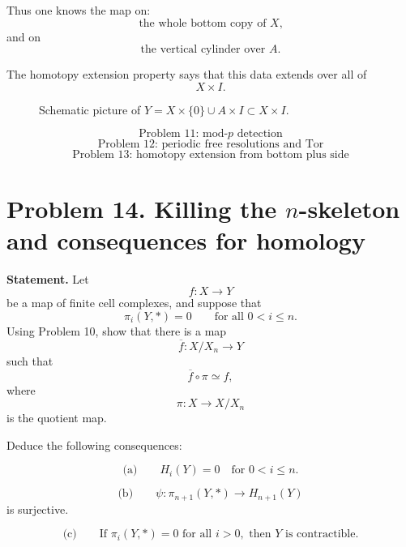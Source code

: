 \documentclass[12pt,a4paper]{article}
\theoremstyle{notespace}
\begin{document}
Thus one knows the map on:
\[
\text{the whole bottom copy of \(X\),}
\]
and on
\[
\text{the vertical cylinder over \(A\).}
\]

The homotopy extension property says that this data extends over all of
\[
X\times I.
\]

\begin{figure}[htbp]
	\centering
	\caption{Schematic picture of \(Y=X\times\{0\}\cup A\times I\subset X\times I\).}
\end{figure}

\[
\boxed{
	\text{Problem 11: mod-\(p\) detection}
}
\]
\[
\boxed{
	\text{Problem 12: periodic free resolutions and Tor}
}
\]
\[
\boxed{
	\text{Problem 13: homotopy extension from bottom plus side}
}
\]

\section{Problem 14. Killing the \(n\)-skeleton and consequences for homology}

\textbf{Statement.}
Let
\[
f:X\to Y
\]
be a map of finite cell complexes, and suppose that
\[
\pi_i(Y,*)=0
\qquad
\text{for all }0<i\leq n.
\]
Using Problem 10, show that there is a map
\[
\overline f:X/X_n\to Y
\]
such that
\[
\overline f\circ \pi\simeq f,
\]
where
\[
\pi:X\to X/X_n
\]
is the quotient map.

Deduce the following consequences:

\[
\text{(a)}\qquad H_i(Y)=0
\quad
\text{for }0<i\leq n.
\]

\[
\text{(b)}\qquad
\psi:\pi_{n+1}(Y,*)\to H_{n+1}(Y)
\]
is surjective.

\[
\text{(c)}\qquad
\text{If }\pi_i(Y,*)=0\text{ for all }i>0,\text{ then }Y\text{ is contractible.}
\]
\end{document}
